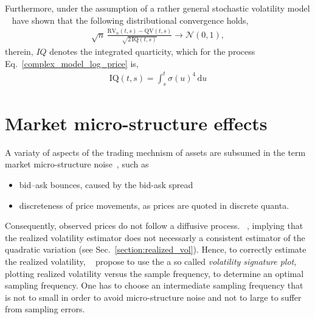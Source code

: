 \documentclass[11pt, a4paper]{thesis}  %
\newcommand{\dd}{\textrm{d}}
\begin{document}
Furthermore, under the assumption of a rather general stochastic volatility model \citeauthor{BarndorffNielsen:2002:EcoAnalysis}~\cite{BarndorffNielsen:2002:EcoAnalysis} have shown that the following distributional convergence holds,
%
%
\begin{eqnarray}
	\sqrt{n}\,
	\frac{\textrm{RV}_n(t,s) - \textrm{QV}(t,s)}{\sqrt{2\,\textrm{IQ}(t,s)}} 
	\rightarrow 
	\mathcal{N}(0,1),
\end{eqnarray} 
%
therein, $IQ$ denotes the integrated quarticity, which for the process Eq.~\ref{complex_model_log_price} is, 
%
\begin{eqnarray}
	\textrm{IQ}(t,s) = \int_s^t \sigma(u)^4\,\dd u
\end{eqnarray}

%

\section{Market micro-structure effects}
\label{section:micro_structure}

A variaty of aspects of the trading mechnism of assets are subsumed in the term market micro-structure noise~\cite{Anderson:2011:micro_structure, Yacine:2009:micro_structure}, such as
\begin{itemize}
	\item bid–ask bounces, caused by the bid-ask spread
	\item discreteness of price movements, as prices are quoted in discrete quanta.
\end{itemize}

\noindent Consequently, observed prices do not follow a diffusive process. \citeauthor{Anderson:2011:micro_structure}~\cite{Anderson:2011:micro_structure}, implying that the realized volatility estimator does not necessarly a consistent estimator of the quadratic variation (see Sec.~\ref{section:realized_vol}). Hence, to correctly estimate the realized volatility, \citeauthor{Andersen:2001:RealizedVol}~\cite{Andersen:2001:RealizedVol} propose to use the a so called {\it volatility signature plot}, plotting realized volatility versus the sample frequency, to determine an optimal sampling frequency. One has to choose an intermediate sampling frequency that is not to small in order to avoid micro-structure noise and not to large to suffer from sampling errors.
\end{document}
